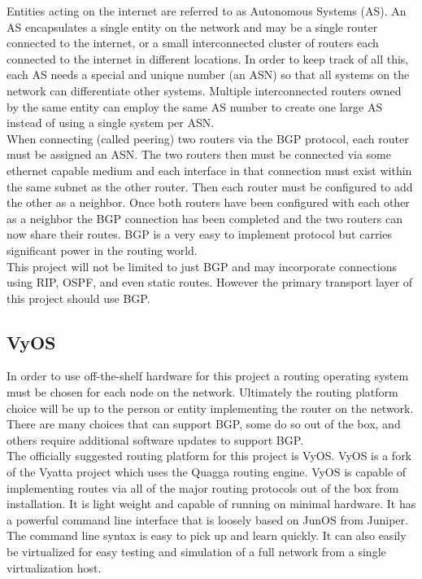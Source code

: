 \documentclass[12pt]{article}
\begin{document}
Entities acting on the internet are referred to as Autonomous Systems (AS). An AS encapsulates a single entity on the network
and may be a single router connected to the internet, or a small interconnected cluster of routers each connected to the internet
in different locations. In order to keep track of all this, each AS needs a special and unique number (an ASN) so that all systems on the network
can differentiate other systems. Multiple interconnected routers owned by the same entity can employ the same AS number to create one
large AS instead of using a single system per ASN.
\\

When connecting (called peering) two routers via the BGP protocol, each router must be assigned an ASN. The two routers then must be connected via 
some ethernet capable medium and each interface in that connection must exist within the same subnet as the other router. Then each router must
be configured to add the other as a neighbor. Once both routers have been configured with each other as a neighbor the BGP connection has been
completed and the two routers can now share their routes. BGP is a very easy to implement protocol but carries significant power in the routing
world.
\\

This project will not be limited to just BGP and may incorporate connections using RIP, OSPF, and even static routes. However the primary transport
layer of this project should use BGP.


\subsection{VyOS}

In order to use off-the-shelf hardware for this project a routing operating system must be chosen for each node on the network. Ultimately the routing
platform choice will be up to the person or entity implementing the router on the network. There are many choices that can support BGP, some do so
out of the box, and others require additional software updates to support BGP.
\\

The officially suggested routing platform for this project is VyOS. VyOS is a fork of the Vyatta project which uses the Quagga routing engine. VyOS
is capable of implementing routes via all of the major routing protocols out of the box from installation. It is light weight and capable of running
on minimal hardware. It has a powerful command line interface that is loosely based on JunOS from Juniper. The command line syntax is easy to pick up
and learn quickly. It can also easily be virtualized for easy testing and simulation of a full network from a single virtualization host. 
\\
\end{document}
